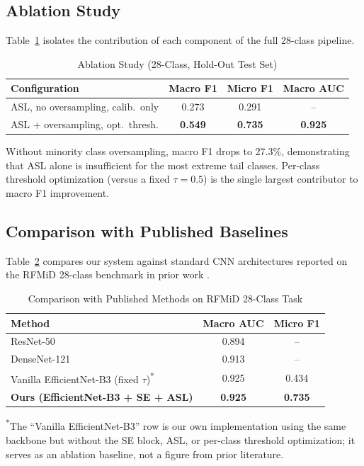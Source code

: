 \documentclass[conference]{IEEEtran}
\begin{document}
\subsection{Ablation Study}
Table~\ref{tab:ablation} isolates the contribution of each component of the full 28-class pipeline.

\begin{table}[htbp]
\centering
\caption{Ablation Study (28-Class, Hold-Out Test Set)}
\label{tab:ablation}
\begin{tabular}{lccc}
\toprule
Configuration & Macro F1 & Micro F1 & Macro AUC \\
\midrule
ASL, no oversampling, calib.\ only & 0.273 & 0.291 & -- \\
ASL + oversampling, opt.\ thresh.   & \textbf{0.549} & \textbf{0.735} & \textbf{0.925} \\
\bottomrule
\end{tabular}
\end{table}

Without minority class oversampling, macro F1 drops to 27.3\%, demonstrating that ASL alone is insufficient for the most extreme tail classes. Per-class threshold optimization (versus a fixed $\tau{=}0.5$) is the single largest contributor to macro F1 improvement.

\subsection{Comparison with Published Baselines}
Table~\ref{tab:comparison} compares our system against standard CNN architectures reported on the RFMiD 28-class benchmark in prior work \cite{pachade2021retinal,kumar2023multi}.

\begin{table}[htbp]
\centering
\caption{Comparison with Published Methods on RFMiD 28-Class Task}
\label{tab:comparison}
\begin{tabular}{lcc}
\toprule
Method & Macro AUC & Micro F1 \\
\midrule
ResNet-50 \cite{pachade2021retinal}          & 0.894 & -- \\
DenseNet-121 \cite{pachade2021retinal}        & 0.913 & -- \\
Vanilla EfficientNet-B3 (fixed $\tau$)\textsuperscript{*}       & 0.925 & 0.434 \\
\textbf{Ours (EfficientNet-B3 + SE + ASL)}      & \textbf{0.925} & \textbf{0.735} \\
\bottomrule
\end{tabular}
\vspace{2pt}
\footnotesize{\textsuperscript{*}The ``Vanilla EfficientNet-B3'' row is our own implementation using the same backbone but without the SE block, ASL, or per-class threshold optimization; it serves as an ablation baseline, not a figure from prior literature.}
\end{table}
\end{document}
